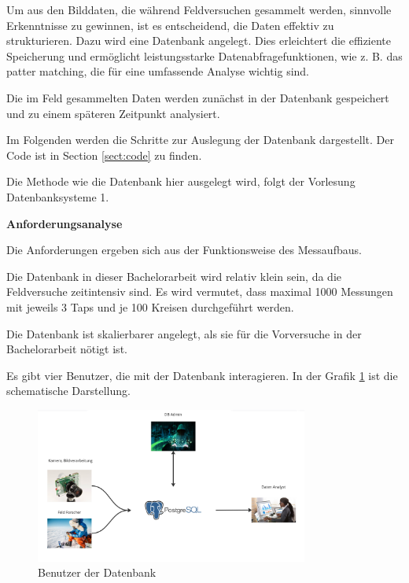 
Um aus den Bilddaten, die während Feldversuchen gesammelt werden, sinnvolle Erkenntnisse zu gewinnen, ist es entscheidend, die Daten effektiv zu strukturieren. Dazu wird eine Datenbank angelegt. Dies erleichtert die effiziente Speicherung und ermöglicht leistungsstarke Datenabfragefunktionen, wie z. B. das patter matching, die für eine umfassende Analyse wichtig sind.

Die im Feld gesammelten Daten werden zunächst in der Datenbank gespeichert und zu einem späteren Zeitpunkt analysiert.

Im Folgenden werden die Schritte zur Auslegung der Datenbank dargestellt. Der Code ist in Section \ref{sect:code} zu finden.

Die Methode wie die Datenbank hier ausgelegt wird, folgt der Vorlesung Datenbanksysteme 1. \cite{}

\textbf{Anforderungsanalyse}

Die Anforderungen ergeben sich aus der Funktionsweise des Messaufbaus.

Die Datenbank in dieser Bachelorarbeit wird relativ klein sein, da die Feldversuche zeitintensiv sind. Es wird vermutet, dass maximal 1000 Messungen mit jeweils 3 Taps und je 100 Kreisen durchgeführt werden.

Die Datenbank ist skalierbarer angelegt, als sie für die Vorversuche in der Bachelorarbeit nötigt ist.

Es gibt vier Benutzer, die mit der Datenbank interagieren. In der Grafik \ref{fig:user-db-entwurf} ist die schematische Darstellung.

\begin{figure}
    \centering
    \includegraphics[width=0.8\textwidth]{Bilder/Screenshotfrom2024-04-0115-26-08.png}
    \caption{Benutzer der Datenbank}
    \label{fig:user-db-entwurf}
\end{figure}

